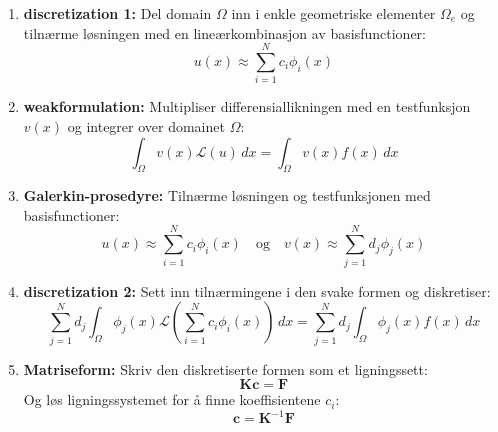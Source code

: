 \documentclass[../main.tex]{subfiles}
\begin{document}
\begin{enumerate}
    \item \textbf{discretization 1:} Del domain \( \Omega \) inn i enkle geometriske elementer \( \Omega_e \) og tilnærme løsningen med en lineærkombinasjon av basisfunctioner:
          \[
              u(x) \approx \sum_{i=1}^N c_i \phi_i(x)
          \]
    \item \textbf{weakformulation:} Multipliser differensiallikningen med en testfunksjon \( v(x) \) og integrer over domainet \( \Omega \):
          \[
              \int_\Omega v(x) \mathcal{L}(u) \, dx = \int_\Omega v(x) f(x) \, dx
          \]

    \item \textbf{Galerkin-prosedyre:} Tilnærme løsningen og testfunksjonen med basisfunctioner:
          \[
              u(x) \approx \sum_{i=1}^N c_i \phi_i(x) \quad \text{og} \quad v(x) \approx \sum_{j=1}^N d_j \phi_j(x)
          \]
    \item \textbf{discretization 2:} Sett inn tilnærmingene i den svake formen og diskretiser:
          \[
              \sum_{j=1}^N d_j \int_\Omega \phi_j(x) \mathcal{L} \left( \sum_{i=1}^N c_i \phi_i(x) \right) \, dx = \sum_{j=1}^N d_j \int_\Omega \phi_j(x) f(x) \, dx
          \]
    \item \textbf{Matriseform:} Skriv den diskretiserte formen som et ligningssett:
          \[
              \symbf{K} \symbf{c} = \symbf{F}
          \]
          Og løs ligningssystemet for å finne koeffisientene \(c_i\):
          \[
              \symbf{c} = \symbf{K}^{-1} \symbf{F}
          \]
\end{enumerate}
\end{document}
